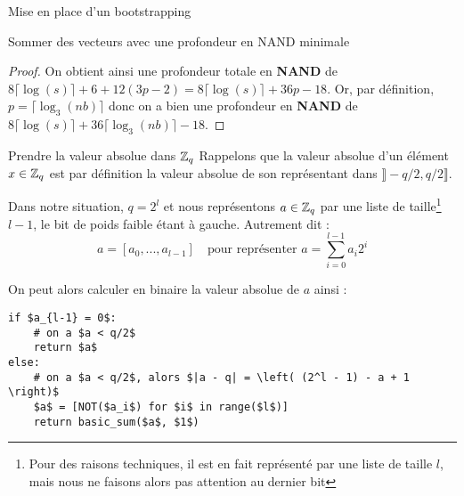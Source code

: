 \begin{section}{Mise en place d'un bootstrapping}
\begin{subsection}{Sommer des vecteurs avec une profondeur en NAND minimale}
\begin{proof}

	On obtient ainsi une profondeur totale en \textbf{NAND} de $8 \lceil
	\log(s)\rceil +
	6+
	12(3p - 2) = 8 \lceil \log(s) \rceil + 36p -18$. Or, par définition, $p = \lceil \log_3(nb)
	\rceil$ donc on a bien une profondeur en \textbf{NAND} de $8 \lceil
	\log(s) \rceil +
	36\lceil\log_3(nb)\rceil -18$.
\end{proof}

\end{subsection}
\begin{subsection}{Prendre la valeur absolue dans $\mathbb{Z}_q$}
	Rappelons que la valeur absolue d'un élément $x\in \mathbb{Z}_q$ est par définition la valeur absolue de son représentant dans $\rrbracket -q/2, q/2\rrbracket$. 
	
	Dans notre situation, $q = 2^l$ et nous représentons $a\in \mathbb{Z}_q$ par une liste de taille\footnote{Pour des raisons techniques, il est en fait représenté par une liste de taille $l$, mais nous ne faisons alors pas attention au dernier bit} $l-1$, le bit de poids faible étant à gauche. Autrement dit :
\[ a = [a_0, ..., a_{l-1}] \quad \text{pour représenter } a = \sum_{i=0}^{l-1} a_i 2^i\]

	On peut alors calculer en binaire la valeur absolue de $a$ ainsi :

\vspace{0.5cm}
\begin{lstlisting}
if $a_{l-1} = 0$: 
	# on a $a < q/2$
	return $a$
else:
	# on a $a < q/2$, alors $|a - q| = \left( (2^l - 1) - a + 1 \right)$
	$a$ = [NOT($a_i$) for $i$ in range($l$)]
	return basic_sum($a$, $1$)
\end{lstlisting}


\end{subsection}
\end{section}
